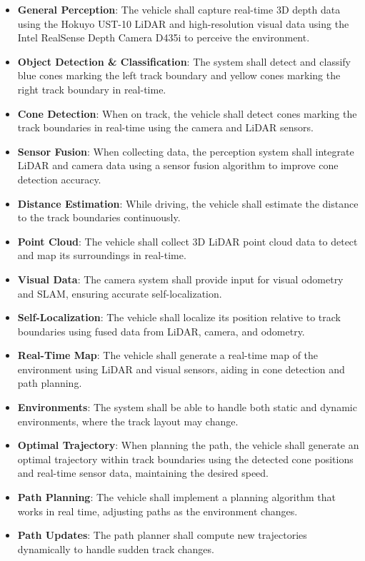 \begin{itemize}
    \item \textbf{General Perception}: The vehicle shall capture real-time 3D depth data using the Hokuyo UST-10 LiDAR and high-resolution visual data using the Intel RealSense Depth Camera D435i to perceive the environment.
    \item \textbf{Object Detection \& Classification}: The system shall detect and classify blue cones marking the left track boundary and yellow cones marking the right track boundary in real-time.
    \item \textbf{Cone Detection}: When on track, the vehicle shall detect cones marking the track boundaries in real-time using the camera and LiDAR sensors.
    \item \textbf{Sensor Fusion}: When collecting data, the perception system shall integrate LiDAR and camera data using a sensor fusion algorithm to improve cone detection accuracy.
    \item \textbf{Distance Estimation}: While driving, the vehicle shall estimate the distance to the track boundaries continuously.
    \item \textbf{Point Cloud}: The vehicle shall collect 3D LiDAR point cloud data to detect and map its surroundings in real-time.
    \item \textbf{Visual Data}: The camera system shall provide input for visual odometry and SLAM, ensuring accurate self-localization.
    \item \textbf{Self-Localization}: The vehicle shall localize its position relative to track boundaries using fused data from LiDAR, camera, and odometry.
    \item \textbf{Real-Time Map}: The vehicle shall generate a real-time map of the environment using LiDAR and visual sensors, aiding in cone detection and path planning.
    \item \textbf{Environments}: The system shall be able to handle both static and dynamic environments, where the track layout may change.
    \item \textbf{Optimal Trajectory}: When planning the path, the vehicle shall generate an optimal trajectory within track boundaries using the detected cone positions and real-time sensor data, maintaining the desired speed.
    \item \textbf{Path Planning}: The vehicle shall implement a planning algorithm that works in real time, adjusting paths as the environment changes.
    \item \textbf{Path Updates}: The path planner shall compute new trajectories dynamically to handle sudden track changes.

\end{itemize}
